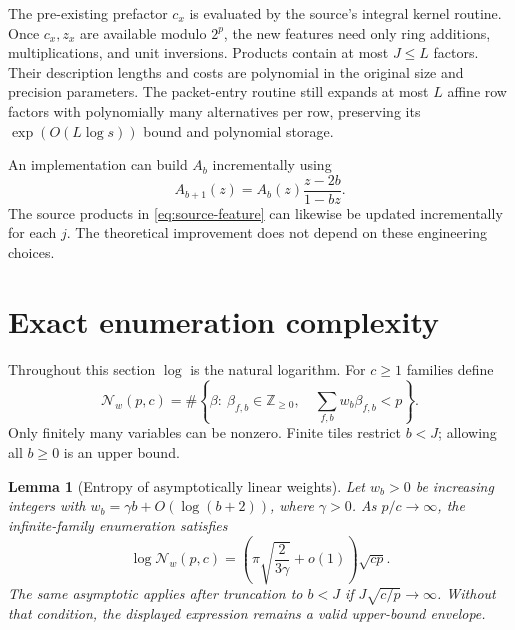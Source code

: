 \documentclass[11pt]{article}
\newtheorem{lemma}[theorem]{Lemma}
\theoremstyle{remark}
\begin{document}
The pre-existing prefactor $c_x$ is evaluated by the source's integral kernel routine. Once $c_x,z_x$ are available modulo $2^p$, the new features need only ring additions, multiplications, and unit inversions. Products contain at most $J\le L$ factors. Their description lengths and costs are polynomial in the original size and precision parameters. The packet-entry routine still expands at most $L$ affine row factors with polynomially many alternatives per row, preserving its $\exp(O(L\log s))$ bound and polynomial storage.

An implementation can build $A_b$ incrementally using
\[
 A_{b+1}(z)=A_b(z)\frac{z-2b}{1-bz}.
\]
The source products in \eqref{eq:source-feature} can likewise be updated incrementally for each $j$. The theoretical improvement does not depend on these engineering choices.

\section{Exact enumeration complexity}\label{sec:entropy}

Throughout this section $\log$ is the natural logarithm. For $c\ge1$ families define
\[
 \mathcal N_w(p,c)=
 \#\left\{\beta:\ \beta_{f,b}\in\mathbb Z_{\ge0},\quad
                \sum_{f,b}w_b\beta_{f,b}<p\right\}.
\]
Only finitely many variables can be nonzero. Finite tiles restrict $b<J$; allowing all $b\ge0$ is an upper bound.

\begin{lemma}[Entropy of asymptotically linear weights]\label{lem:entropy}
Let $w_b>0$ be increasing integers with $w_b=\gamma b+O(\log(b+2))$, where $\gamma>0$. As $p/c\to\infty$, the infinite-family enumeration satisfies
\begin{equation}\label{eq:general-entropy}
 \log\mathcal N_w(p,c)
 =\left(\pi\sqrt{\frac{2}{3\gamma}}+o(1)\right)\sqrt{cp}.
\end{equation}
The same asymptotic applies after truncation to $b<J$ if $J\sqrt{c/p}\to\infty$. Without that condition, the displayed expression remains a valid upper-bound envelope.
\end{lemma}
\end{document}

